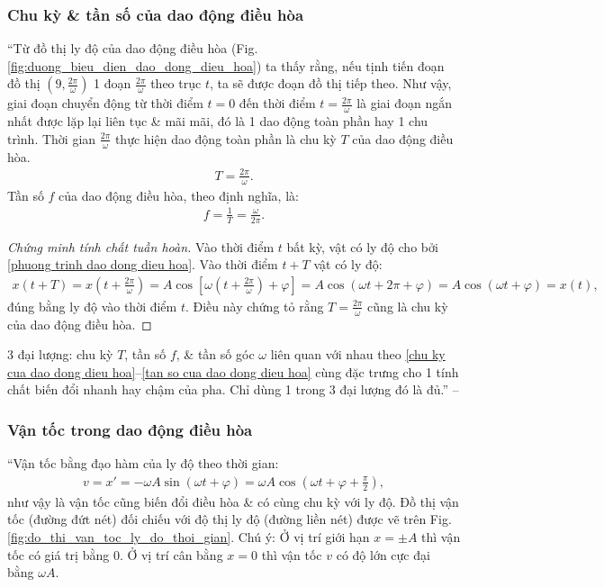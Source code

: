 \documentclass{article}
\numberwithin{equation}{section}
\begin{document}
\subsubsection{Chu kỳ \& tần số của dao động điều hòa}
``Từ đồ thị ly độ của dao động điều hòa (Fig. \ref{fig:duong_bieu_dien_dao_dong_dieu_hoa}) ta thấy rằng, nếu tịnh tiến đoạn đồ thị $\left(9,\frac{2\pi}{\omega}\right)$ 1 đoạn $\frac{2\pi}{\omega}$ theo trục $t$, ta sẽ được đoạn đồ thị tiếp theo. Như vậy, giai đoạn chuyển động từ thời điểm $t = 0$ đến thời điểm $t = \frac{2\pi}{\omega}$ là giai đoạn ngắn nhất được lặp lại liên tục \& mãi mãi, đó là 1 dao động toàn phần hay 1 chu trình. Thời gian $\frac{2\pi}{\omega}$ thực hiện dao động toàn phần là chu kỳ $T$ của dao động điều hòa.
\begin{align}
	\label{chu ky cua dao dong dieu hoa}
	T = \frac{2\pi}{\omega}.
\end{align}
Tần số $f$ của dao động điều hòa, theo định nghĩa, là:
\begin{align}
	\label{tan so cua dao dong dieu hoa}
	f = \frac{1}{T} = \frac{\omega}{2\pi}.
\end{align}

\begin{proof}[Chứng minh tính chất tuần hoàn]
	Vào thời điểm $t$ bất kỳ, vật có ly độ cho bởi \eqref{phuong trinh dao dong dieu hoa}. Vào thời điểm $t + T$ vật có ly độ:
	\begin{align*}
		x(t + T) = x\left(t + \frac{2\pi}{\omega}\right) = A\cos\left[\omega\left(t + \frac{2\pi}{\omega}\right) + \varphi\right] = A\cos(\omega t + 2\pi + \varphi) = A\cos(\omega t + \varphi) = x(t),
	\end{align*}
	đúng bằng ly độ vào thời điểm $t$. Điều này chứng tỏ rằng $T = \frac{2\pi}{\omega}$ cũng là chu kỳ của dao động điều hòa.
\end{proof}
3 đại lượng: chu kỳ $T$, tần số $f$, \& tần số góc $\omega$ liên quan với nhau theo \eqref{chu ky cua dao dong dieu hoa}--\eqref{tan so cua dao dong dieu hoa} cùng đặc trưng cho 1 tính chất biến đổi nhanh hay chậm của pha. Chỉ dùng 1 trong 3 đại lượng đó là đủ.'' -- \cite[p. 32]{SGK_Vat_Ly_12_nang_cao}

\subsubsection{Vận tốc trong dao động điều hòa}
``Vận tốc bằng đạo hàm của ly độ theo thời gian:
\begin{align}
	\label{van toc dao dong dieu hoa}
	v = x' = -\omega A\sin(\omega t + \varphi) = \omega A\cos\left(\omega t + \varphi + \frac{\pi}{2}\right),
\end{align}
như vậy là vận tốc cũng biến đổi điều hòa \& có cùng chu kỳ với ly độ. Đồ thị vận tốc (đường đứt nét) đối chiếu với độ thị ly độ (đường liền nét) được vẽ trên Fig. \ref{fig:do_thi_van_toc_ly_do_thoi_gian}. Chú ý: Ở vị trí giới hạn $x = \pm A$ thì vận tốc có giá trị bằng $0$. Ở vị trí cân bằng $x = 0$ thì vận tốc $v$ có độ lớn cực đại bằng $\omega A$.
\end{document}
